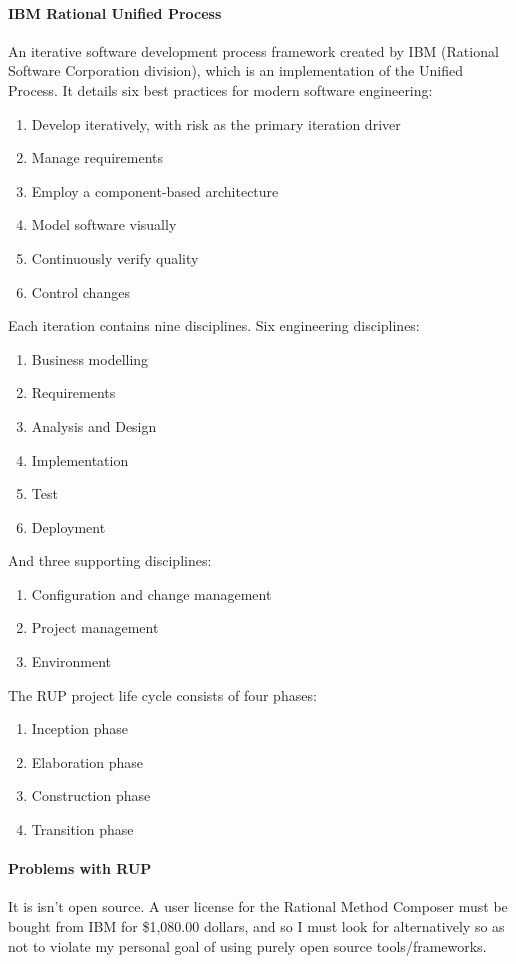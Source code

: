 \paragraph{IBM Rational Unified Process} An iterative software development
process framework created by IBM (Rational Software Corporation division), which
is an implementation of the Unified Process. It details six best practices for
modern software engineering:

\begin{enumerate}
\item Develop iteratively, with risk as the primary iteration driver
\item Manage requirements
\item Employ a component-based architecture
\item Model software visually
\item Continuously verify quality
\item Control changes
\end{enumerate}

\noindent
Each iteration contains nine disciplines. Six engineering disciplines:
\begin{enumerate}
\item Business modelling
\item Requirements
\item Analysis and Design
\item Implementation
\item Test
\item Deployment
\end{enumerate}

\noindent
And three supporting disciplines:
\begin{enumerate}
\item Configuration and change management
\item Project management
\item Environment
\end{enumerate}

\noindent
The RUP project life cycle consists of four phases:
\begin{enumerate}
\item Inception phase
\item Elaboration phase
\item Construction phase
\item Transition phase
\end{enumerate}

\paragraph{Problems with RUP} It is isn’t open source. A user license for the
Rational Method Composer must be bought from IBM for \$1,080.00 dollars, and so
I must look for alternatively so as not to violate my personal goal of using
purely open source tools/frameworks.


